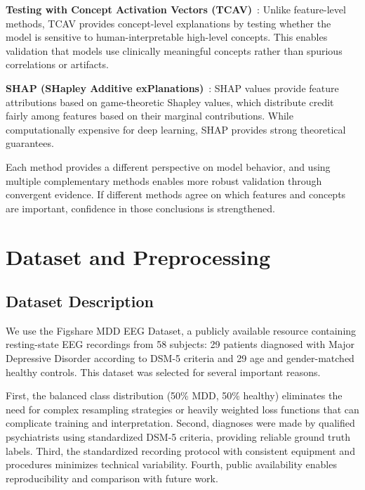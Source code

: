 \documentclass[blue,fullpaper]{ludusofficial}  %
\begin{document}
\textbf{Testing with Concept Activation Vectors (TCAV)}~\cite{kim2018interpretability}: Unlike feature-level methods, TCAV provides concept-level explanations by testing whether the model is sensitive to human-interpretable high-level concepts. This enables validation that models use clinically meaningful concepts rather than spurious correlations or artifacts.

\textbf{SHAP (SHapley Additive exPlanations)}~\cite{lundberg2017unified}: SHAP values provide feature attributions based on game-theoretic Shapley values, which distribute credit fairly among features based on their marginal contributions. While computationally expensive for deep learning, SHAP provides strong theoretical guarantees.

Each method provides a different perspective on model behavior, and using multiple complementary methods enables more robust validation through convergent evidence. If different methods agree on which features and concepts are important, confidence in those conclusions is strengthened.

\section{Dataset and Preprocessing}

\subsection{Dataset Description}

We use the Figshare MDD EEG Dataset, a publicly available resource containing resting-state EEG recordings from 58 subjects: 29 patients diagnosed with Major Depressive Disorder according to DSM-5 criteria and 29 age and gender-matched healthy controls. This dataset was selected for several important reasons.

First, the balanced class distribution (50\% MDD, 50\% healthy) eliminates the need for complex resampling strategies or heavily weighted loss functions that can complicate training and interpretation. Second, diagnoses were made by qualified psychiatrists using standardized DSM-5 criteria, providing reliable ground truth labels. Third, the standardized recording protocol with consistent equipment and procedures minimizes technical variability. Fourth, public availability enables reproducibility and comparison with future work.
\end{document}
